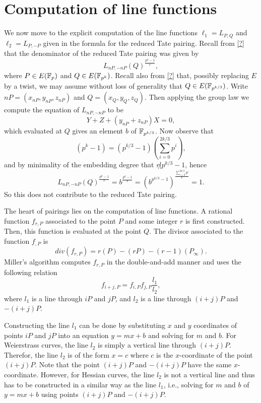 \section{Computation of line functions}

We now move to the explicit computation of the line functions
$\ell_{1} = L_{P,Q}$ and $\ell_{2} = L_{P,-P}$
given in the formula for the reduced Tate pairing.
Recall from \ref{?} that the denominator of the reduced Tate pairing was given by	%
\[L_{nP,-nP}(Q)^{\frac{p^{k}-1}{r}},\]
where $P \in E(\mathbb{F}_{p})$ and $Q \in E(\mathbb{F}_{p^{k}})$.
Recall also from \ref{?} that, possibly replacing $E$ by a twist,			%
we may assume without loss of generality that $Q \in E(\mathbb{F}_{p^{k/3}})$.
Write $nP = (x_{nP},y_{nP},z_{nP})$ and $Q=(x_{Q},y_{Q},z_{Q})$.
Then applying the group law we compute the equation of $L_{nP,-nP}$ to be
\[Y + Z + (y_{nP} + z_{nP})X = 0,\] which evaluated at $Q$ gives an element $b$ of $\mathbb{F}_{p^{k/3}}$.
Now observe that
\[(p^{k} -1) = (p^{k/3}-1)(\sum_{i=0}^{2k/3} p^{i}),\]
and by minimality of the embedding degree that $r \not | p^{k/3}-1$,
hence
\[L_{nP,-nP}(Q)^{\frac{p^{k}-1}{r}} = b^{\frac{p^{k}-1}{r}} = (b^{p^{k/3}-1})^\frac{\sum_{i=0}^{2k/3} p^{i}}{r} = 1.\]
So this does not contribute to the reduced Tate pairing.

The heart of pairings lies on the computation of line functions.
A rational function $f_{r,P}$ associated to the point $P$ and some integer $r$
is first constructed.
Then, this function is evaluated at the point $Q$.
The divisor associated to the function $f_{,P}$ is
$$ div(f_{r,P}) = r(P) - (rP) - (r-1)(P_\infty). $$
Miller's algorithm computes $f_{r,P}$ in the double-and-add manner
and uses the following relation
$$ f_{i+j,P} = f_{i,P} f_{j,P} \frac{l_1}{l_2}, $$
where $l_1$ is a line through $iP$ and $jP$,
and $l_2$ is a line through $(i+j)P$ and $-(i+j)P$.

Constructing the line $l_1$ can be done by substituting $x$ and $y$ coordinates of points $iP$ and $jP$
into an equation $y = mx + b$ and solving for $m$ and $b$.
For Weierstrass curves, the line $l_2$ is simply a vertical line through $(i+j)P$.
Therefor, the line $l_2$ is of the form $x = c$ where $c$ is the $x$-coordinate of the point $(i+j)P$.
Note that the point $(i+j)P$ and $-(i+j)P$ have the same $x$-coordinate.
However, for Hessian curves, the line $l_2$ is not a vertical line
and thus has to be constructed in a similar way as the line $l_1$,
i.e., solving for $m$ and $b$ of $y = mx + b$ using points $(i+j)P$ and $-(i+j)P$.

